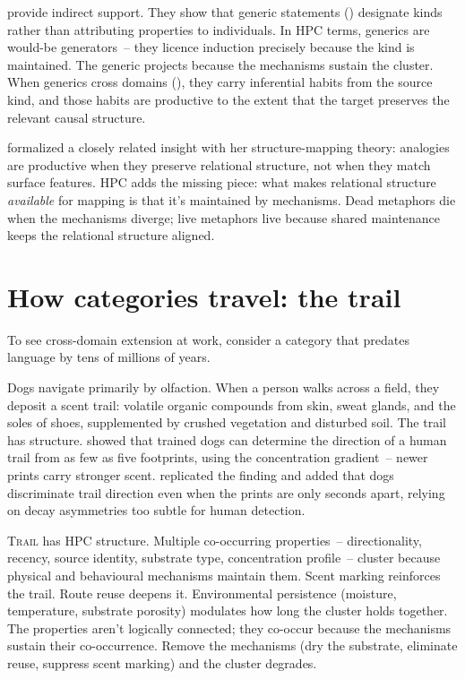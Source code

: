 \textcite{noyes2019} provide indirect support. They show that generic statements () designate kinds rather than attributing properties to individuals. In HPC terms, generics are would-be generators~-- they licence induction precisely because the kind is maintained. The generic projects because the mechanisms sustain the cluster. When generics cross domains (), they carry inferential habits from the source kind, and those habits are productive to the extent that the target preserves the relevant causal structure.

\textcite{gentner1983} formalized a closely related insight with her structure-mapping theory: analogies are productive when they preserve relational structure, not when they match surface features. HPC adds the missing piece: what makes relational structure \emph{available} for mapping is that it's maintained by mechanisms. Dead metaphors die when the mechanisms diverge; live metaphors live because shared maintenance keeps the relational structure aligned.

\section{How categories travel: the trail}
\label{sec:16c:trail}

To see cross-domain extension at work, consider a category that predates language by tens of millions of years.

Dogs navigate primarily by olfaction. When a person walks across a field, they deposit a scent trail: volatile organic compounds from skin, sweat glands, and the soles of shoes, supplemented by crushed vegetation and disturbed soil. The trail has structure. \textcite{thesen1993} showed that trained dogs can determine the direction of a human trail from as few as five footprints, using the concentration gradient~-- newer prints carry stronger scent. \textcite{hepper2005} replicated the finding and added that dogs discriminate trail direction even when the prints are only seconds apart, relying on decay asymmetries too subtle for human detection.

\textsc{Trail} has HPC structure. Multiple co-occurring properties~-- directionality, recency, source identity, substrate type, concentration profile~-- cluster because physical and behavioural mechanisms maintain them. Scent marking reinforces the trail. Route reuse deepens it. Environmental persistence (moisture, temperature, substrate porosity) modulates how long the cluster holds together. The properties aren't logically connected; they co-occur because the mechanisms sustain their co-occurrence. Remove the mechanisms (dry the substrate, eliminate reuse, suppress scent marking) and the cluster degrades.

